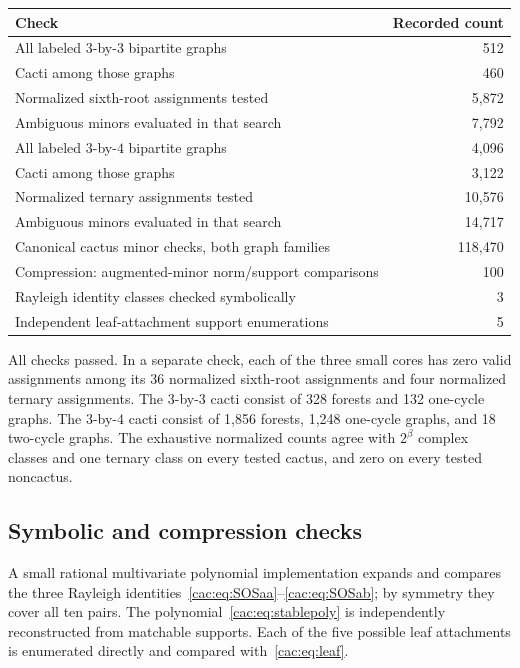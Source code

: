 \documentclass[11pt]{article}
\numberwithin{equation}{section}
\theoremstyle{definition}
\begin{document}
\begin{center}
\small
\begin{tabularx}{\textwidth}{@{}Xr@{}}\toprule
Check & Recorded count\\\midrule
All labeled $3$-by-$3$ bipartite graphs & 512\\
Cacti among those graphs & 460\\
Normalized sixth-root assignments tested & 5,872\\
Ambiguous minors evaluated in that search & 7,792\\
All labeled $3$-by-$4$ bipartite graphs & 4,096\\
Cacti among those graphs & 3,122\\
Normalized ternary assignments tested & 10,576\\
Ambiguous minors evaluated in that search & 14,717\\
Canonical cactus minor checks, both graph families & 118,470\\
Compression: augmented-minor norm/support comparisons & 100\\
Rayleigh identity classes checked symbolically & 3\\
Independent leaf-attachment support enumerations & 5\\\bottomrule
\end{tabularx}
\end{center}
All checks passed. In a separate check, each of the three small cores has zero valid assignments among its 36 normalized sixth-root assignments and four normalized ternary assignments. The $3$-by-$3$ cacti consist of 328 forests and 132 one-cycle graphs. The $3$-by-$4$ cacti consist of 1,856 forests, 1,248 one-cycle graphs, and 18 two-cycle graphs. The exhaustive normalized counts agree with $2^{\beta}$ complex classes and one ternary class on every tested cactus, and zero on every tested noncactus.

\subsection{Symbolic and compression checks}
A small rational multivariate polynomial implementation expands and compares the three Rayleigh identities~\eqref{cac:eq:SOSaa}--\eqref{cac:eq:SOSab}; by symmetry they cover all ten pairs. The polynomial~\eqref{cac:eq:stablepoly} is independently reconstructed from matchable supports. Each of the five possible leaf attachments is enumerated directly and compared with~\eqref{cac:eq:leaf}.
\end{document}
